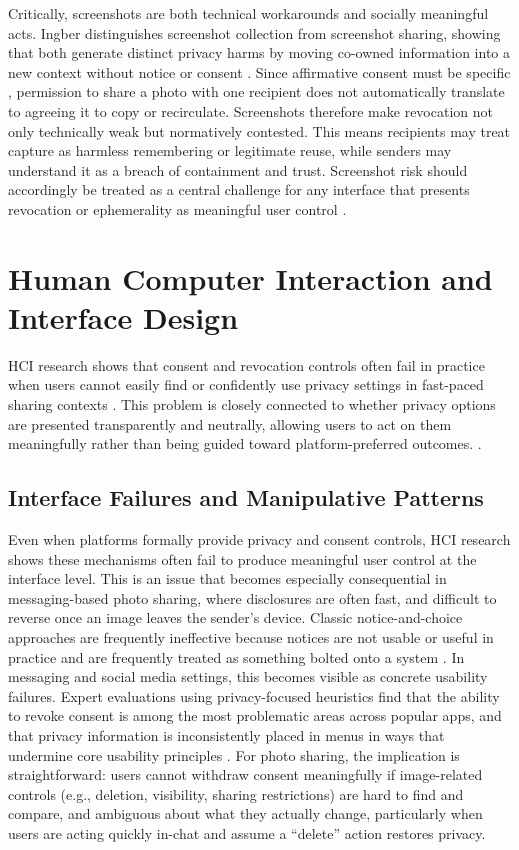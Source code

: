 Critically, screenshots are both technical workarounds and socially meaningful acts. Ingber distinguishes screenshot collection from screenshot sharing, showing that both generate distinct privacy harms by moving co-owned information into a new context without notice or consent \cite{ingber_2025}. Since affirmative consent must be specific \cite{im_yes_2021}, permission to share a photo with one recipient does not automatically translate to agreeing it to copy or recirculate. Screenshots therefore make revocation not only technically weak but normatively contested. This means recipients may treat capture as harmless remembering or legitimate reuse, while senders may understand it as a breach of containment and trust. Screenshot risk should accordingly be treated as a central challenge for any interface that presents revocation or ephemerality as meaningful user control \cite{ingber_2025, heath_2023, liu_privacy_2023}.

\section{Human Computer Interaction and Interface Design}
HCI research shows that consent and revocation controls often fail in practice when users cannot easily find or confidently use privacy settings in fast-paced sharing contexts \cite{bourgeus_vandercruysse_2024,wilbanks_design_2018}. This problem is closely connected to whether privacy options are presented transparently and neutrally, allowing users to act on them meaningfully rather than being guided toward platform-preferred outcomes. \cite{nouwens_dark_2020}.

\subsection{Interface Failures and Manipulative Patterns}
Even when platforms formally provide privacy and consent controls, HCI research shows these mechanisms often fail to produce meaningful user control at the interface level. This is an issue that becomes especially consequential in messaging-based photo sharing, where disclosures are often fast, and difficult to reverse once an image leaves the sender’s device. Classic notice-and-choice approaches are frequently ineffective because notices are not usable or useful in practice and are frequently treated as something bolted onto a system \cite{schaub_notice_2015}. In messaging and social media settings, this becomes visible as concrete usability failures. Expert evaluations using privacy-focused heuristics find that the ability to revoke consent is among the most problematic areas across popular apps, and that privacy information is inconsistently placed in menus in ways that undermine core usability principles \cite{albesher_2021}. For photo sharing, the implication is straightforward: users cannot withdraw consent meaningfully if image-related controls (e.g., deletion, visibility, sharing restrictions) are hard to find and compare, and ambiguous about what they actually change, particularly when users are acting quickly in-chat and assume a “delete” action restores privacy.

